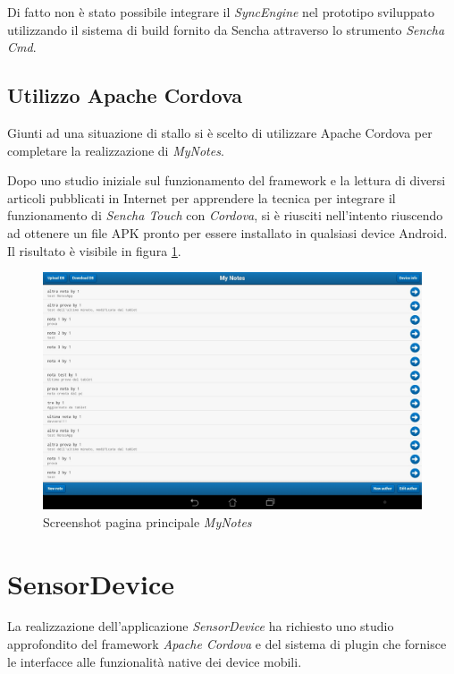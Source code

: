 Di fatto non è stato possibile integrare il \emph{SyncEngine} nel prototipo sviluppato utilizzando il sistema di build fornito da Sencha attraverso lo strumento \emph{Sencha Cmd}.

\subsection{Utilizzo Apache Cordova}
Giunti ad una situazione di stallo si è scelto di utilizzare Apache Cordova per completare la realizzazione di \emph{MyNotes}.

Dopo uno studio iniziale sul funzionamento del framework \cite{apache:cordova} e la lettura di diversi articoli pubblicati in Internet \cite{andidog:packageSenchaPhonegap} \cite{sencha:senchaMVCphonegap} \cite{bgmemo:senchaPhonegap} per apprendere la tecnica per integrare il funzionamento di \emph{Sencha Touch} con \emph{Cordova}, si è riusciti nell'intento riuscendo ad ottenere un file \ac{APK} pronto per essere installato in qualsiasi device Android.
Il risultato è visibile in figura \ref{fig:screenshot mynotes}.

\begin{figure}[htb]
\centering
\includegraphics[scale=0.25]{gfx/screenshot/screen_MyNotes}
\caption{Screenshot pagina principale \emph{MyNotes}}
\label{fig:screenshot mynotes}
\end{figure}

\section{SensorDevice}
La realizzazione dell'applicazione \emph{SensorDevice} ha richiesto uno studio approfondito del framework \emph{Apache Cordova} \cite{apache:cordova} e del sistema di plugin che fornisce le interfacce alle funzionalità native dei device mobili.


